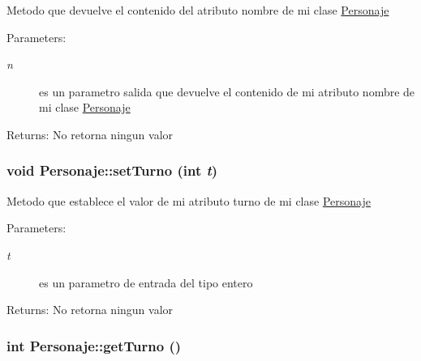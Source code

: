 Metodo que devuelve el contenido del atributo nombre de mi clase \hyperlink{classPersonaje}{Personaje} \begin{Desc}
\item[Parameters:]
\begin{description}
\item[{\em n}]es un parametro salida que devuelve el contenido de mi atributo nombre de mi clase \hyperlink{classPersonaje}{Personaje} \end{description}
\end{Desc}
\begin{Desc}
\item[Returns:]No retorna ningun valor \end{Desc}
\hypertarget{classPersonaje_de04da7a674a165aeaa09566b219a828}{
\subsubsection[setTurno]{\setlength{\rightskip}{0pt plus 5cm}void Personaje::setTurno (int {\em t})}}
\label{classPersonaje_de04da7a674a165aeaa09566b219a828}


Metodo que establece el valor de mi atributo turno de mi clase \hyperlink{classPersonaje}{Personaje} \begin{Desc}
\item[Parameters:]
\begin{description}
\item[{\em t}]es un parametro de entrada del tipo entero \end{description}
\end{Desc}
\begin{Desc}
\item[Returns:]No retorna ningun valor \end{Desc}
\hypertarget{classPersonaje_425c743df0309deab48e9575d715eed9}{
\subsubsection[getTurno]{\setlength{\rightskip}{0pt plus 5cm}int Personaje::getTurno ()}}
\label{classPersonaje_425c743df0309deab48e9575d715eed9}


